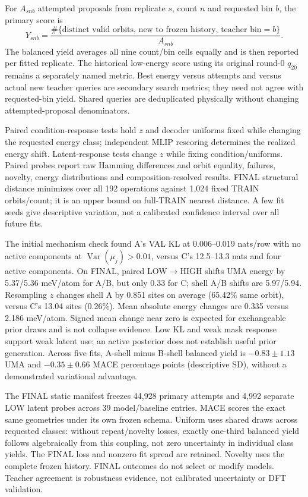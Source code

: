 \documentclass[10pt]{article}
\begin{document}
For $A_{snb}$ attempted proposals from replicate $s$, count $n$ and requested bin
$b$, the primary score is
\begin{equation}
Y_{snb}=\frac{\#\{\text{distinct valid orbits, new to frozen history, teacher bin}=b\}}
{A_{snb}}.
\end{equation}
The balanced yield averages all nine count/bin cells equally and is then
reported per fitted replicate. The historical low-energy score using its original
round-0 $q_{20}$ remains a separately named metric. Best energy versus attempts
and versus actual new teacher queries are secondary search metrics; they need
not agree with requested-bin yield. Shared queries are deduplicated physically
without changing attempted-proposal denominators.

Paired condition-response tests hold $z$ and decoder uniforms fixed while changing
the requested energy class; independent MLIP rescoring determines the realized
energy shift. Latent-response tests change $z$ while fixing condition/uniforms.
Paired probes report raw Hamming differences and orbit equality, failures,
novelty, energy distributions and composition-resolved results. FINAL structural
distance minimizes over all 192 operations against 1,024 fixed TRAIN orbits/count;
it is an upper bound on full-TRAIN nearest distance. A few fit seeds give
descriptive variation, not a calibrated confidence interval over all future fits.



The initial mechanism check found A's VAL KL at 0.006--0.019 nats/row with
no active components at $\operatorname{Var}(\mu_j)>0.01$, versus C's 12.5--13.3
nats and four active components. On FINAL, paired LOW$\to$HIGH shifts UMA energy
by 5.37/5.36 meV/atom for A/B, but only 0.33 for C; shell A/B shifts are
5.97/5.94. Resampling $z$ changes shell A by 0.851 sites on average (65.42\%
same orbit), versus C's 13.04 sites (0.26\%). Mean absolute energy changes are
0.335 versus 2.186 meV/atom. Signed mean change near zero is expected for
exchangeable prior draws and is not collapse evidence. Low KL and weak mask
response support weak latent use; an active posterior does not establish useful
prior generation. Across five fits, A-shell minus B-shell balanced yield is
$-0.83\pm1.13$ UMA and $-0.35\pm0.66$ MACE percentage points (descriptive SD),
without a demonstrated variational advantage.

The FINAL static manifest freezes 44,928 primary attempts and 4,992 separate
LOW latent probes across 39 model/baseline entries. MACE scores the exact same
geometries under its own frozen schema. Uniform uses shared draws across
requested classes: without repeat/novelty losses, exactly one-third balanced
yield follows algebraically from this coupling, not zero uncertainty in individual
class yields. The FINAL loss and nonzero fit spread are retained. Novelty
uses the complete frozen history. FINAL outcomes do not select or modify models.
Teacher agreement is robustness evidence, not calibrated uncertainty or DFT
validation.
\newpage
\end{document}
